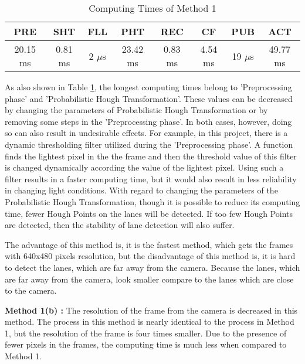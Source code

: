 \begin{table}[ht]
\caption{Computing Times of Method 1} 
\centering 
  \begin{tabular}{ | c | c | c | c | c | c | c | c |}
    \hline
  
  PRE & SHT & FLL & PHT & REC & CF & PUB & ACT \\ \hline  
  20.15 ms & 0.81 ms & 2 $\mu$s & 23.42 ms & 0.83 ms & 4.54 ms & 19 $\mu$s& 49.77 ms \\ \hline  
    
    
      \end{tabular}
      \label{tab:Case1_Times}
      \end{table}


As also shown in Table \ref{tab:Case1_Times}, the longest computing times belong to 'Preprocessing phase' and 'Probabilistic Hough Transformation'. These values can be decreased by changing the parameters of Probabilistic Hough Transformation or by removing some steps in the 'Preprocessing phase'. In both cases, however, doing so can also result in undesirable effects. For example, in this project, there is a dynamic thresholding filter utilized during the 'Preprocessing phase'. A function finds the lightest pixel in the the frame and then the threshold value of this filter is changed dynamically according the value of the lightest pixel. Using such a filter results in a faster computing time, but it would also result in less reliability in changing light conditions. With regard to changing the parameters of the Probabilistic Hough Transformation, though it is possible to reduce its computing time, fewer Hough Points on the lanes will be detected. If too few Hough Points are detected, then the stability of lane detection will also suffer.

The advantage of this method is, it is the fastest method, which gets the frames with 640x480 pixels resolution, but the disadvantage of this method is, it is hard to detect the lanes, which are far away from the camera. Because the lanes, which are far away from the camera, look smaller compare to the lanes which are close to the camera.




\textbf{Method 1(b) : }The resolution of the frame from the camera is decreased in this method. The
process in this method is nearly identical to the process in Method 1, but the resolution of the frame is four times smaller. Due to the presence of fewer pixels in the frames, the computing time is much less when compared to Method 1.



